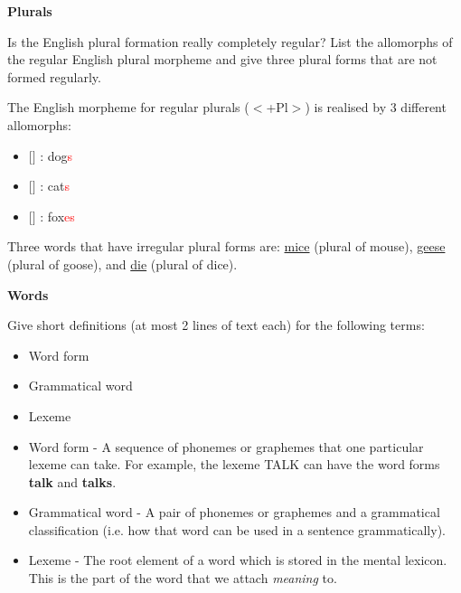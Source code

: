 \documentclass[11pt]{article}
\begin{document}
\vspace*{0.5cm} %

\begin{problem}{2}
\textbf{Plurals}

Is the English plural formation really completely regular? List the allomorphs of the regular English plural morpheme and give three plural forms that are not formed regularly.
\end{problem}

\begin{solution}
The English morpheme for regular plurals ($<$+Pl$>$) is realised by 3 different allomorphs:
\begin{itemize}
	\item $[$$]$ : dog\textcolor{red}{s}
	\item $[$$]$ : cat\textcolor{red}{s}
	\item $[$$]$ : fox\textcolor{red}{es}
\end{itemize}

Three words that have irregular plural forms are: \underline{mice} (plural of mouse), \underline{geese} (plural of goose), and \underline{die} (plural of dice). 

\end{solution}

\vspace*{0.5cm}
\newpage

\begin{problem}{3}
\textbf{Words}

Give short definitions (at most 2 lines of text each) for the following terms:
\begin{itemize}
	\item Word form
	\item Grammatical word
	\item Lexeme
\end{itemize}

\end{problem}

\begin{solution}
\begin{itemize}
	\item Word form - A sequence of phonemes or graphemes that one particular lexeme can take.  For example, the lexeme TALK can have the word forms \textbf{talk} and \textbf{talks}.
	\item Grammatical word - A pair of phonemes or graphemes and a grammatical classification (i.e. how that word can be used in a sentence grammatically).
	\item Lexeme - The root element of a word which is stored in the mental lexicon.  This is the part of the word that we attach \textit{meaning} to.
\end{itemize}
\end{solution}
\end{document}
